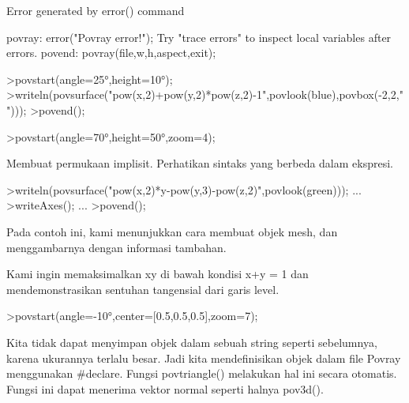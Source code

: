 \documentclass[a4paper,10pt]{article}
\begin{document}
\begin{eulernotebook}
\begin{euleroutput}
  Error generated by error() command
  
  povray:
      error("Povray error!");
  Try "trace errors" to inspect local variables after errors.
  povend:
      povray(file,w,h,aspect,exit); 
\end{euleroutput}
\begin{eulerprompt}
>povstart(angle=25°,height=10°); 
>writeln(povsurface("pow(x,2)+pow(y,2)*pow(z,2)-1",povlook(blue),povbox(-2,2,"")));
>povend();
\end{eulerprompt}
\begin{eulerprompt}
>povstart(angle=70°,height=50°,zoom=4);
\end{eulerprompt}
\begin{eulercomment}
Membuat permukaan implisit. Perhatikan sintaks yang berbeda dalam
ekspresi.
\end{eulercomment}
\begin{eulerprompt}
>writeln(povsurface("pow(x,2)*y-pow(y,3)-pow(z,2)",povlook(green))); ...
>writeAxes(); ...
>povend();
\end{eulerprompt}
\begin{eulercomment}
Pada contoh ini, kami menunjukkan cara membuat objek mesh, dan
menggambarnya dengan informasi tambahan.

Kami ingin memaksimalkan xy di bawah kondisi x+y = 1 dan
mendemonstrasikan sentuhan tangensial dari garis level.
\end{eulercomment}
\begin{eulerprompt}
>povstart(angle=-10°,center=[0.5,0.5,0.5],zoom=7);
\end{eulerprompt}
\begin{eulercomment}
Kita tidak dapat menyimpan objek dalam sebuah string seperti
sebelumnya, karena ukurannya terlalu besar. Jadi kita mendefinisikan
objek dalam file Povray menggunakan #declare. Fungsi povtriangle()
melakukan hal ini secara otomatis. Fungsi ini dapat menerima vektor
normal seperti halnya pov3d().


\end{eulercomment}
\end{eulernotebook}
\end{document}
